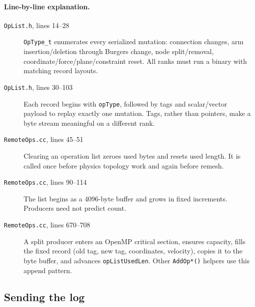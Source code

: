 \documentclass[11pt]{article}
\newcommand{\code}[1]{\texorpdfstring{\nolinkurl{#1}}{#1}}
\newcommand{\srcfile}[1]{\texorpdfstring{\nolinkurl{#1}}{#1}}
\begin{document}
\paragraph{Line-by-line explanation.}
\begin{description}
\item[\srcfile{OpList.h}, lines 14--28] \code{OpType_t} enumerates every
serialized mutation: connection changes, arm insertion/deletion through
Burgers change, node split/removal, coordinate/force/plane/constraint reset.
All ranks must run a binary with matching record layouts.
\item[\srcfile{OpList.h}, lines 30--103] Each record begins with
\code{opType}, followed by tags and scalar/vector payload to replay exactly
one mutation. Tags, rather than pointers, make a byte stream meaningful on a
different rank.
\item[\srcfile{RemoteOps.cc}, lines 45--51] Clearing an operation list zeroes
used bytes and resets used length. It is called once before physics topology
work and again before remesh.
\item[\srcfile{RemoteOps.cc}, lines 90--114] The list begins as a 4096-byte
buffer and grows in fixed increments. Producers need not predict count.
\item[\srcfile{RemoteOps.cc}, lines 670--708] A split producer enters an
OpenMP critical section, ensures capacity, fills the fixed record (old tag,
new tag, coordinates, velocity), copies it to the byte buffer, and advances
\code{opListUsedLen}. Other \code{AddOp*()} helpers use this append pattern.
\end{description}

\subsection{Sending the log}


\end{document}
